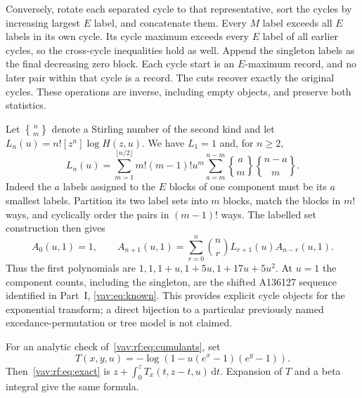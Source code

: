 \documentclass[11pt]{article}
\theoremstyle{remark}\newtheorem{remark}[theorem]{Remark}
\newcommand{\dd}{\,\mathrm d}
\newcommand{\stirling}[2]{\genfrac\{\}{0pt}{}{#1}{#2}}
\begin{document}
Conversely, rotate each separated cycle to that representative, sort the cycles by increasing largest $E$ label, and concatenate them. Every $M$ label exceeds all $E$ labels in its own cycle. Its cycle maximum exceeds every $E$ label of all earlier cycles, so the cross-cycle inequalities hold as well. Append the singleton labels as the final decreasing zero block. Each cycle start is an $E$-maximum record, and no later pair within that cycle is a record. The cuts recover exactly the original cycles. These operations are inverse, including empty objects, and preserve both statistics.

Let $\stirling{n}{m}$ denote a Stirling number of the second kind and let
$L_n(u)=n![z^n]\log H(z,u)$. We have $L_1=1$ and, for $n\ge2$,
\begin{equation}\label{vav:rf:eq:cumulants}
 L_n(u)=\sum_{m=1}^{\lfloor n/2\rfloor}m!(m-1)!u^m
       \sum_{a=m}^{n-m}\stirling{a}{m}\stirling{n-a}{m}.
\end{equation}
Indeed the $a$ labels assigned to the $E$ blocks of one component must be its $a$ smallest labels. Partition its two label sets into $m$ blocks, match the blocks in $m!$ ways, and cyclically order the pairs in $(m-1)!$ ways. The labelled set construction then gives
\begin{equation}\label{vav:rf:eq:bell}
 A_0(u,1)=1,\qquad
 A_{n+1}(u,1)=\sum_{r=0}^n\binom nr L_{r+1}(u)A_{n-r}(u,1).
\end{equation}
Thus the first polynomials are
$1,1,1+u,1+5u,1+17u+5u^2$.
At $u=1$ the component counts, including the singleton, are the shifted A136127 sequence identified in Part~I, \eqref{vav:eq:known}. This provides explicit cycle objects for the exponential transform; a direct bijection to a particular previously named excedance-permutation or tree model is not claimed.

For an analytic check of~\eqref{vav:rf:eq:cumulants}, set
\[
 T(x,y,u)=-\log(1-u(e^x-1)(e^y-1)).
\]
Then~\eqref{vav:rf:eq:exact} is $z+\int_0^zT_x(t,z-t,u)\dd t$. Expansion of $T$ and a beta integral give the same formula.
\end{document}
